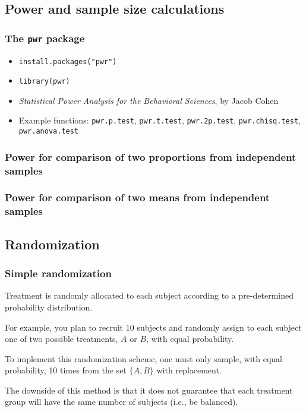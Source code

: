 \documentclass{beamer}
\begin{document}
\subsection{Power and sample size calculations}

\begin{frame}
    \frametitle{The \texttt{pwr} package}
    \begin{itemize}
      \item \texttt{install.packages("pwr")}
      \item \texttt{library(pwr)}
      \item \emph{Statistical Power Analysis for the Behavioral Sciences}, by Jacob Cohen
      \item Example functions: \texttt{pwr.p.test},
            \texttt{pwr.t.test}, \texttt{pwr.2p.test},
            \texttt{pwr.chisq.test}, \texttt{pwr.anova.test}
    \end{itemize}
\end{frame}


\begin{frame}[fragile]
    \frametitle{Power for comparison of two proportions from independent samples}
    \fontsize{10}{12}\selectfont
    
\end{frame}


\begin{frame}[fragile]
    \frametitle{Power for comparison of two means from independent samples}
    \fontsize{10}{12}\selectfont
    
\end{frame}




\subsection{Randomization}

\begin{frame}
    \frametitle{Simple randomization}
	Treatment is randomly allocated to each subject according to a pre-determined probability distribution.\\
	
	\bigskip
	
	For example, you plan to recruit 10 subjects and randomly assign to each subject 
	one of two possible treatments, $A$ or $B$, with equal probability.
	
	\bigskip
	
	To implement this randomization scheme, one must only sample, with equal probability,
	10 times from the set $\{A, B\}$ with replacement.
	
	\bigskip
	
	The downside of this method is that it does not guarantee that each treatment group will
	have the same number of subjects (i.e., be balanced).
\end{frame}
\end{document}
